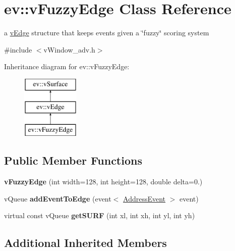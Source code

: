 \hypertarget{classev_1_1vFuzzyEdge}{}\section{ev\+:\+:v\+Fuzzy\+Edge Class Reference}
\label{classev_1_1vFuzzyEdge}


a \hyperlink{classev_1_1vEdge}{v\+Edge} structure that keeps events given a \char`\"{}fuzzy\char`\"{} scoring system  




{\ttfamily \#include $<$v\+Window\+\_\+adv.\+h$>$}

Inheritance diagram for ev\+:\+:v\+Fuzzy\+Edge\+:\begin{figure}[H]
\begin{center}
\leavevmode
\includegraphics[height=3.000000cm]{classev_1_1vFuzzyEdge}
\end{center}
\end{figure}
\subsection*{Public Member Functions}
\begin{DoxyCompactItemize}
\item 
\mbox{\label{classev_1_1vFuzzyEdge_a4fa6e20618a528a591baf2f098cace53}} 
{\bfseries v\+Fuzzy\+Edge} (int width=128, int height=128, double delta=0.)
\item 
\mbox{\label{classev_1_1vFuzzyEdge_a61803b783119945df5c130c12d99e9c2}} 
v\+Queue {\bfseries add\+Event\+To\+Edge} (event$<$ \hyperlink{classev_1_1AddressEvent}{Address\+Event} $>$ event)
\item 
\mbox{\label{classev_1_1vFuzzyEdge_a335aeb48314d3e2068a55ee0a6958643}} 
virtual const v\+Queue {\bfseries get\+S\+U\+RF} (int xl, int xh, int yl, int yh)
\end{DoxyCompactItemize}
\subsection*{Additional Inherited Members}


